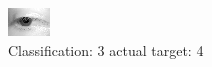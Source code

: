 \begin{figure}[h!]
\begin{center}
\includegraphics[width=0.60\columnwidth]{figures/ID2676_class_3_target_4.png}
\end{center}
\caption{ Classification: 3 actual target: 4}
\label{fig:ID2676_class_3_target_4}
\end{figure}
